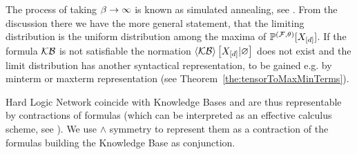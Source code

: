 \begin{remark}
	The process of taking $\beta\rightarrow\infty$ is known as simulated annealing, see .
	From the discussion there we have the more general statement, that the limiting distribution is the uniform distribution among the maxima of $\mathbb{P}^{(\mathcal{F},\theta)}[X_{[d]}]$.
	If the formula $\mathcal{KB}$ is not satisfiable the normation $\left\langle \mathcal{KB}\right\rangle \left[ X_{[d]} | \varnothing \right]$ does not exist and the limit distribution has another syntactical representation, to be gained e.g. by minterm or maxterm representation (see Theorem~\ref{the:tensorToMaxMinTerms}).
\end{remark}












Hard Logic Network coincide with Knowledge Bases and are thus representable by contractions of formulas (which can be interpreted as an effective calculus scheme, see ).
We use $\land$ symmetry to represent them as a contraction of the formulas building the Knowledge Base as conjunction.

